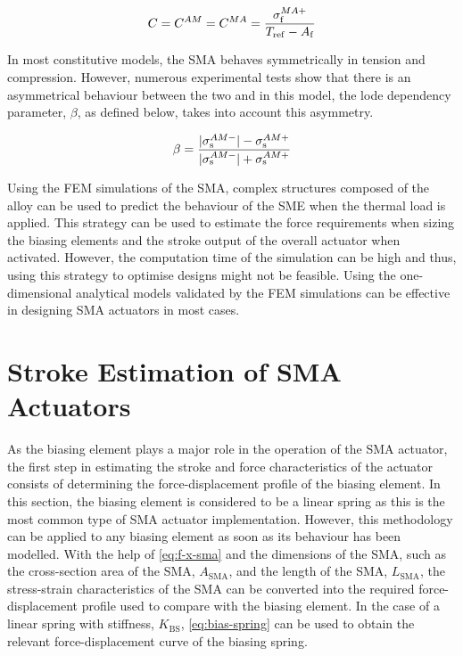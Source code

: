 \begin{equation}
    \label{eq:fem-C}
    C = C^{AM}=C^{MA}=\frac{\sigma_\mathrm{f}^{MA+}}{T_\mathrm{ref}-A_\mathrm{f}}
\end{equation}

In most constitutive models, the SMA behaves symmetrically in tension and compression. However, numerous experimental tests show that there is an asymmetrical behaviour between the two and in this model, the lode dependency parameter, $\beta$, as defined below, takes into account this asymmetry.

\begin{equation}
    \label{eq:fem-beta}
    \beta = \frac{|\sigma_\mathrm{s}^{AM-}|-\sigma_\mathrm{s}^{AM+}}{|\sigma_\mathrm{s}^{AM-}|+\sigma_\mathrm{s}^{AM+}}
\end{equation}

Using the FEM simulations of the SMA, complex structures composed of the alloy can be used to predict the behaviour of the SME when the thermal load is applied. This strategy can be used to estimate the force requirements when sizing the biasing elements and the stroke output of the overall actuator when activated. However, the computation time of the simulation can be high and thus, using this strategy to optimise designs might not be feasible. Using the one-dimensional analytical models validated by the FEM simulations can be effective in designing SMA actuators in most cases.

\section{Stroke Estimation of SMA Actuators}\label{sec:stroke-estimation}
As the biasing element plays a major role in the operation of the SMA actuator, the first step in estimating the stroke and force characteristics of the actuator consists of determining the force-displacement profile of the biasing element. In this section, the biasing element is considered to be a linear spring as this is the most common type of SMA actuator implementation. However, this methodology can be applied to any biasing element as soon as its behaviour has been modelled. With the help of \cref{eq:f-x-sma} and the dimensions of the SMA, such as the cross-section area of the SMA, $A_\mathrm{SMA}$, and the length of the SMA, $L_\mathrm{SMA}$, the stress-strain characteristics of the SMA can be converted into the required force-displacement profile used to compare with the biasing element. In the case of a linear spring with stiffness, $K_\mathrm{BS}$, \cref{eq:bias-spring} can be used to obtain the relevant force-displacement curve of the biasing spring.

